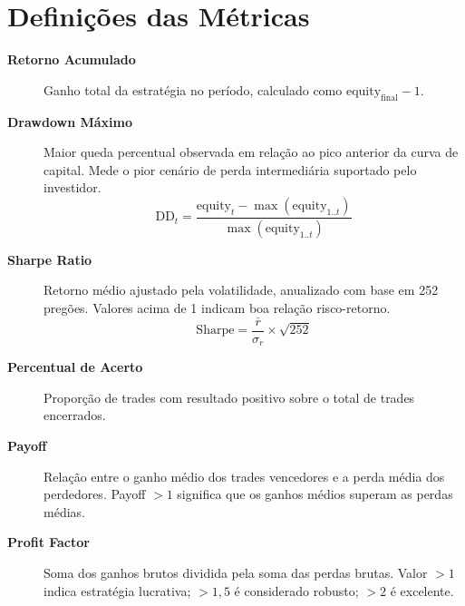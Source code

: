 \documentclass[12pt, a4paper]{article}
\begin{document}
\section{Definições das Métricas}

\begin{description}
  \item[\textbf{Retorno Acumulado}] Ganho total da estratégia no período, calculado como $\text{equity}_{\text{final}} - 1$.

  \item[\textbf{Drawdown Máximo}] Maior queda percentual observada em relação ao pico anterior da curva de capital. Mede o pior cenário de perda intermediária suportado pelo investidor.
  $$\text{DD}_t = \frac{\text{equity}_t - \max(\text{equity}_{1..t})}{\max(\text{equity}_{1..t})}$$

  \item[\textbf{Sharpe Ratio}] Retorno médio ajustado pela volatilidade, anualizado com base em 252 pregões. Valores acima de 1 indicam boa relação risco-retorno.
  $$\text{Sharpe} = \frac{\bar{r}}{\sigma_r} \times \sqrt{252}$$

  \item[\textbf{Percentual de Acerto}] Proporção de trades com resultado positivo sobre o total de trades encerrados.

  \item[\textbf{Payoff}] Relação entre o ganho médio dos trades vencedores e a perda média dos perdedores. Payoff $> 1$ significa que os ganhos médios superam as perdas médias.

  \item[\textbf{Profit Factor}] Soma dos ganhos brutos dividida pela soma das perdas brutas. Valor $> 1$ indica estratégia lucrativa; $> 1{,}5$ é considerado robusto; $> 2$ é excelente.
\end{description}
\end{document}
